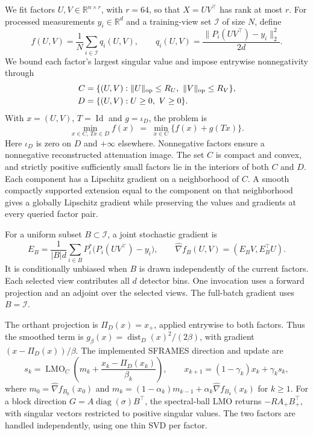 We fit factors \(U,V\in\mathbb R^{n\times r}\), with \(r=64\), so that
\(X=UV^\top\) has rank at most \(r\). For processed measurements
\(y_i\in\mathbb R^d\) and a training-view set \(\mathcal I\) of size
\(N\), define
\begin{equation}
 f(U,V)=\frac1N\sum_{i\in\mathcal I}q_i(U,V),\qquad
 q_i(U,V)=\frac{\|P_i(UV^\top)-y_i\|_2^2}{2d}.
 \label{eq:ct-loss}
\end{equation}
We bound each factor's largest singular value and impose entrywise
nonnegativity through
\begin{equation}
 \begin{split}
 C&=\{(U,V):\|U\|_{\rm op}\le R_U,\ \|V\|_{\rm op}\le R_V\},\\
 D&=\{(U,V):U\ge0,\ V\ge0\}.
 \end{split}
 \label{eq:ct-sets}
\end{equation}
With \(x=(U,V)\), \(T=\operatorname{Id}\) and \(g=\iota_D\), the
problem is
\begin{equation}
 \min_{x\in C,\,Tx\in D} f(x)
 \;=\;\min_{x\in C}\{f(x)+g(Tx)\}.
 \label{eq:ct-problem}
\end{equation}
Here \(\iota_D\) is zero on \(D\) and \(+\infty\) elsewhere.
Nonnegative factors ensure a nonnegative reconstructed attenuation image.
The set \(C\) is compact and convex, and strictly positive sufficiently
small factors lie in the interiors of both \(C\) and \(D\). Each component
has a Lipschitz gradient on a neighborhood of \(C\). A smooth compactly
supported extension equal to the component on that neighborhood gives a
globally Lipschitz gradient while preserving the values and gradients at
every queried factor pair.

For a uniform subset \(B\subset\mathcal I\), a joint stochastic gradient is
\begin{equation}
 E_B=\frac{1}{|B|d}\sum_{i\in B}P_i^\ast\bigl(P_i(UV^\top)-y_i\bigr),
 \qquad \widehat\nabla f_B(U,V)=(E_BV,E_B^\top U).
 \label{eq:ct-gradient}
\end{equation}
It is conditionally unbiased when \(B\) is drawn independently of the
current factors. Each selected view contributes all \(d\) detector bins.
One invocation uses a forward projection and an adjoint over the selected
views. The full-batch gradient uses \(B=\mathcal I\).

The orthant projection is \(\Pi_D(x)=x_+\), applied entrywise to both
factors. Thus the smoothed term is
\(g_{\beta}(x)=\operatorname{dist}_D(x)^2/(2\beta)\), with gradient
\((x-\Pi_D(x))/\beta\). The implemented SFRAMES direction and update are
\begin{equation}
 s_k=\operatorname{LMO}_C\!\left(m_k+
        \frac{x_k-\Pi_D(x_k)}{\beta_k}\right),\qquad
 x_{k+1}=(1-\gamma_k)x_k+\gamma_k s_k,
 \label{eq:ct-update}
\end{equation}
where \(m_0=\widehat\nabla f_{B_0}(x_0)\) and
\(m_k=(1-\alpha_k)m_{k-1}+\alpha_k\widehat\nabla f_{B_k}(x_k)\) for
\(k\ge1\). For a block direction \(G=A\operatorname{diag}(\sigma)B^\top\),
the spectral-ball LMO returns \(-RA_+B_+^\top\), with singular vectors
restricted to positive singular values. The two factors are handled
independently, using one thin SVD per factor.

